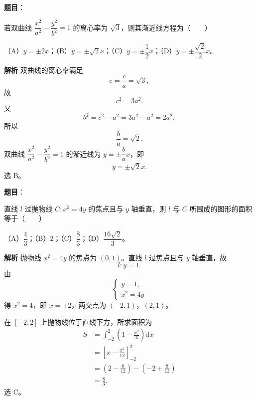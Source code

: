 \begin{answer}

\textbf{题目}：

若双曲线 $\dfrac{x^2}{a^2}-\dfrac{y^2}{b^2}=1$ 的离心率为 $\sqrt3$，则其渐近线方程为\mbox{（　　）}

（A）$y=\pm2x$；（B）$y=\pm\sqrt2x$；（C）$y=\pm\dfrac12x$；（D）$y=\pm\dfrac{\sqrt2}2x$。

\textbf{解析}
双曲线的离心率满足
\nopagebreak[4]
\[e=\frac ca=\sqrt3,\]
故
\nopagebreak[4]
\[c^2=3a^2.\]
又
\nopagebreak[4]
\[b^2=c^2-a^2=3a^2-a^2=2a^2,\]
所以
\nopagebreak[4]
\[\frac ba=\sqrt2.\]
双曲线 $\dfrac{x^2}{a^2}-\dfrac{y^2}{b^2}=1$ 的渐近线为 $y=\pm\dfrac bax$，即
\nopagebreak[4]
\[y=\pm\sqrt2x.\]
选 B。


\end{answer}
\begin{answer}

\textbf{题目}：

直线 $l$ 过抛物线 $C:x^2=4y$ 的焦点且与 $y$ 轴垂直，则 $l$ 与 $C$ 所围成的图形的面积等于\mbox{（　　）}

（A）$\dfrac43$；（B）$2$；（C）$\dfrac83$；（D）$\dfrac{16\sqrt2}3$。

\textbf{解析}
抛物线 $x^2=4y$ 的焦点为 $(0,1)$。直线 $l$ 过焦点且与 $y$ 轴垂直，故
\nopagebreak[4]
\[l:y=1.\]
由
\nopagebreak[4]
\[\begin{cases}y=1,\\x^2=4y\end{cases}\]
得 $x^2=4$，即 $x=\pm2$，两交点为 $(-2,1)$，$(2,1)$。

在 $[-2,2]$ 上抛物线位于直线下方，所求面积为
\nopagebreak[4]
\[\begin{aligned}
S&=\int_{-2}^{2}\left(1-\frac{x^2}4\right)\mathrm dx\\
&=\left[x-\frac{x^3}{12}\right]_{-2}^{2}\\
&=\left(2-\frac{8}{12}\right)-\left(-2+\frac{8}{12}\right)\\
&=\frac83.
\end{aligned}\]
选 C。


\end{answer}
